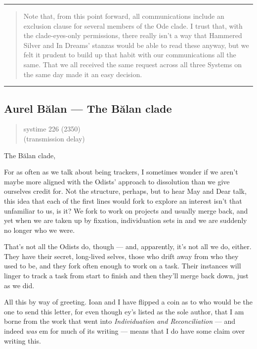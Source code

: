 \null
\vfill
\begin{center}\rule{0.5\linewidth}{0.5pt}\end{center}

\begin{quote}
Note that, from this point forward, all communications include an exclusion clause for several members of the Ode clade. I trust that, with the clade-eyes-only permissions, there really isn't a way that Hammered Silver and In Dreams' stanzas would be able to read these anyway, but we felt it prudent to build up that habit with our communications all the same. That we all received the same request across all three Systems on the same day made it an easy decision.
\end{quote}

\begin{center}\rule{0.5\linewidth}{0.5pt}\end{center}
\vfill
\newpage

\hypertarget{aurel-bux103lan-the-bux103lan-clade}{%
\subsection{Aurel Bălan — The Bălan clade}\label{aurel-bux103lan-the-bux103lan-clade}}

\begin{quote}
systime 226 (2350)\\
(transmission delay)
\end{quote}

The Bălan clade,

For as often as we talk about being trackers, I sometimes wonder if we aren't maybe more aligned with the Odists' approach to dissolution than we give ourselves credit for. Not the structure, perhaps, but to hear May and Dear talk, this idea that each of the first lines would fork to explore an interest isn't that unfamiliar to us, is it? We fork to work on projects and usually merge back, and yet when we are taken up by fixation, individuation sets in and we are suddenly no longer who we were.

That's not all the Odists do, though — and, apparently, it's not all we do, either. They have their secret, long-lived selves, those who drift away from who they used to be, and they fork often enough to work on a task. Their instances will linger to track a task from start to finish and then they'll merge back down, just as we did.

All this by way of greeting. Ioan and I have flipped a coin as to who would be the one to send this letter, for even though ey's listed as the sole author, that I am borne from the work that went into \emph{Individuation and Reconciliation} — and indeed \emph{was} em for much of its writing — means that I do have some claim over writing this.

